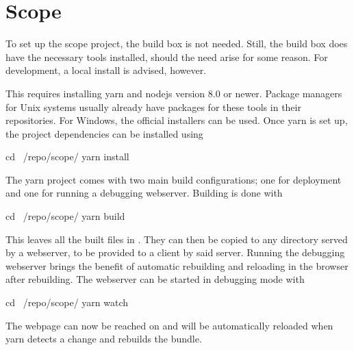 %
%
\chapter{Scope} %
\label{ch:devguide:scope}


To set up the scope project, the build box is not needed. Still, the build box
does  have the  necessary  tools installed,  should the  need  arise for  some
reason.  For development, a local install is advised, however.

This  requires installing  yarn  and  nodejs version  8.0  or newer.   Package
managers for  Unix systems usually  already have  packages for these  tools in
their repositories. For  Windows, the official  installers can be  used.  Once
yarn is set up, the project dependencies can be installed using
\begin{commandshell}
    cd ~/repo/scope/
    yarn install
\end{commandshell}
\noindent The yarn  project comes with two main  build configurations; one for
deployment and one for running a debugging webserver. Building is done with
\begin{commandshell}
    cd ~/repo/scope/
    yarn build
\end{commandshell}

This leaves all the built files in . They can then be
copied to any directory  served by a webserver, to be provided  to a client by
said server.  Running the debugging  webserver brings the benefit of automatic
rebuilding and reloading in the browser after rebuilding. The webserver can be
started in debugging mode with
\begin{commandshell}
    cd ~/repo/scope/
    yarn watch
\end{commandshell}
The webpage  can now  be reached on   and  will be
automatically reloaded when yarn detects a change and rebuilds the bundle.

